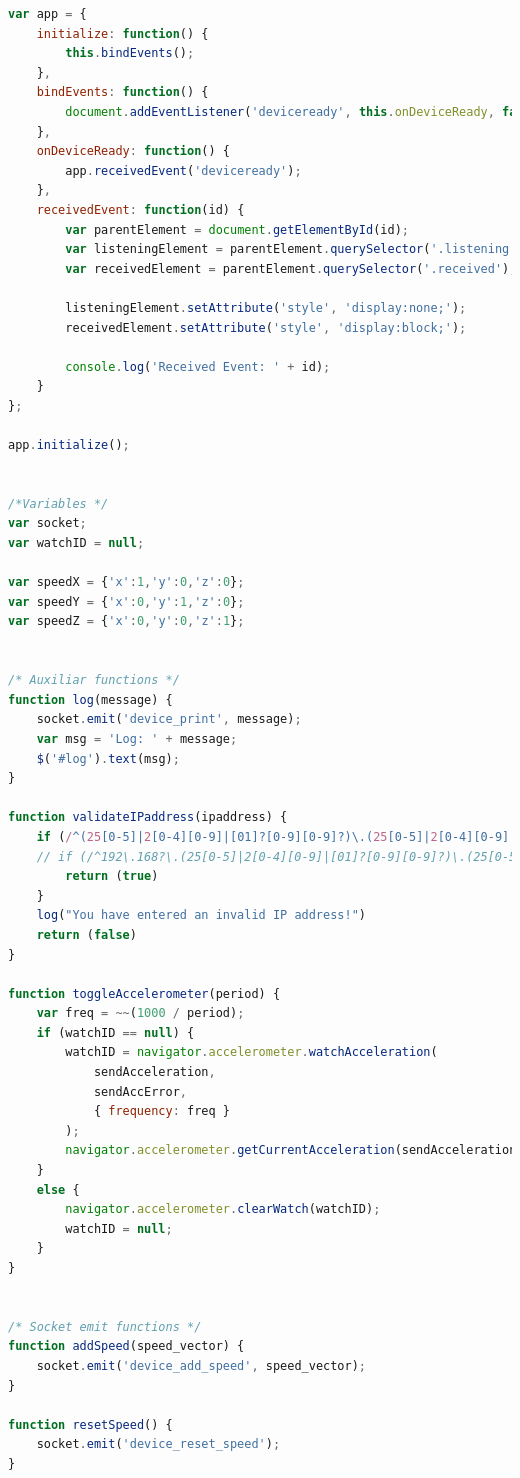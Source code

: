 \documentclass[a4paper,12pt]{article}
\begin{document}
\begin{lstlisting}[language=JavaScript]
var app = {
    initialize: function() {
        this.bindEvents();
    },
    bindEvents: function() {
        document.addEventListener('deviceready', this.onDeviceReady, false);
    },
    onDeviceReady: function() {
        app.receivedEvent('deviceready');
    },
    receivedEvent: function(id) {
        var parentElement = document.getElementById(id);
        var listeningElement = parentElement.querySelector('.listening');
        var receivedElement = parentElement.querySelector('.received');

        listeningElement.setAttribute('style', 'display:none;');
        receivedElement.setAttribute('style', 'display:block;');

        console.log('Received Event: ' + id);
    }
};

app.initialize();


/*Variables */
var socket;
var watchID = null;

var speedX = {'x':1,'y':0,'z':0};
var speedY = {'x':0,'y':1,'z':0};
var speedZ = {'x':0,'y':0,'z':1};


/* Auxiliar functions */
function log(message) {
    socket.emit('device_print', message);
    var msg = 'Log: ' + message;
    $('#log').text(msg);
}

function validateIPaddress(ipaddress) {
    if (/^(25[0-5]|2[0-4][0-9]|[01]?[0-9][0-9]?)\.(25[0-5]|2[0-4][0-9]|[01]?[0-9][0-9]?)\.(25[0-5]|2[0-4][0-9]|[01]?[0-9][0-9]?)\.(25[0-5]|2[0-4][0-9]|[01]?[0-9][0-9]?)$/.test(ipaddress)) {
    // if (/^192\.168?\.(25[0-5]|2[0-4][0-9]|[01]?[0-9][0-9]?)\.(25[0-5]|2[0-4][0-9]|[01]?[0-9][0-9]?)$/.test(ipaddress)) {
        return (true)
    }
    log("You have entered an invalid IP address!")
    return (false)
}

function toggleAccelerometer(period) {
    var freq = ~~(1000 / period);
    if (watchID == null) {
        watchID = navigator.accelerometer.watchAcceleration(
            sendAcceleration,
            sendAccError,
            { frequency: freq }
        );
        navigator.accelerometer.getCurrentAcceleration(sendAcceleration, sendAccError);
    }
    else {
        navigator.accelerometer.clearWatch(watchID);
        watchID = null;
    }
}


/* Socket emit functions */
function addSpeed(speed_vector) {
    socket.emit('device_add_speed', speed_vector);
}

function resetSpeed() {
    socket.emit('device_reset_speed');
}


\end{lstlisting}
\end{document}
